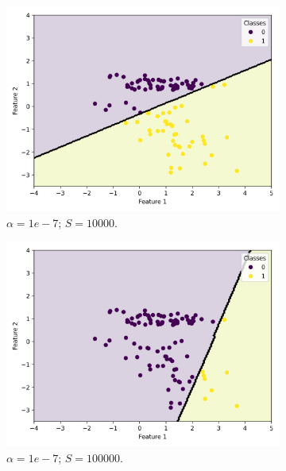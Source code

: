 \documentclass{article}
\begin{document}
\begin{figure}
\begin{subfigure}[t]{0.24\textwidth}
    \centering
    \includegraphics[width=\linewidth]{scatter_predictions_with_contour_3_learning_rate_1_sample_10000.png}
    \caption{$\alpha = 1e-7$; $S = 10000$.}
  \end{subfigure}
  \hfill
  \begin{subfigure}[t]{0.24\textwidth}
    \centering
    \includegraphics[width=\linewidth]{scatter_predictions_with_contour_3_learning_rate_1_sample_100000.png}
    \caption{$\alpha = 1e-7$; $S = 100000$.}
  \end{subfigure}
  \begin{subfigure}[t]{0.24\textwidth}
    \centering

\end{subfigure}
\end{figure}
\end{document}
